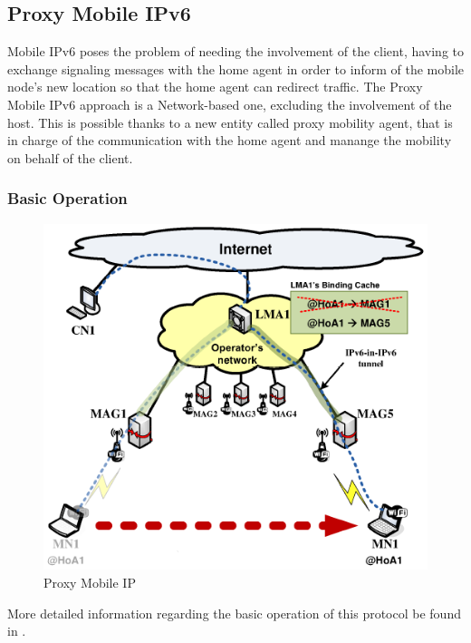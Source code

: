 \subsection{Proxy Mobile IPv6}\label{sec:chap2_dmm_pmip}

Mobile IPv6 poses the problem of needing the involvement of the client, having to exchange signaling messages with the home agent in order to inform of the mobile node's new location so that the home agent can redirect traffic. The Proxy Mobile IPv6 approach is a Network-based one, excluding the involvement of the host. This is possible thanks to a new entity called proxy mobility agent, that is in charge of the communication with the home agent and manange the mobility on behalf of the client.

\subsubsection{Basic Operation}\label{sec:chap2_dmm_pip_bo}

\begin{center}
\begin{figure}[h!]
  \centering
    \includegraphics[scale=0.3]{./images/pmip}
	\caption{Proxy Mobile IP}
	\label{pmip-fig}
\end{figure}
\end{center}

More detailed information regarding the basic operation of this protocol be found in \cite{rfc_5213}.


